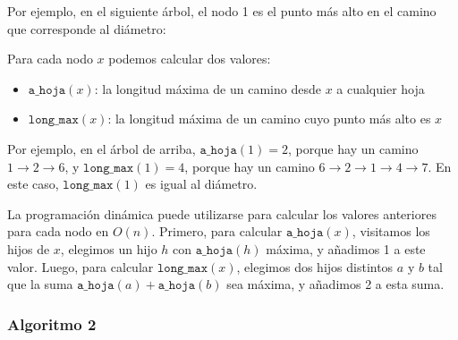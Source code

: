 Por ejemplo, en el siguiente árbol, el nodo 1 es el punto más alto
en el camino que corresponde al diámetro:
\begin{center}
\end{center}

Para cada nodo $x$ podemos calcular dos valores:
\begin{itemize}
    \item $\texttt{a\_hoja}(x)$: la longitud máxima de un camino
          desde $x$ a cualquier hoja
    \item $\texttt{long\_max}(x)$: la longitud máxima de un camino
          cuyo punto más alto es $x$
\end{itemize}

Por ejemplo, en el árbol de arriba, $\texttt{a\_hoja}(1)=2$, porque
hay un camino $1 \rightarrow 2 \rightarrow 6$, y $\texttt{long\_max}(1)=4$,
porque hay un camino
$6 \rightarrow 2 \rightarrow 1 \rightarrow 4 \rightarrow 7$.
En este caso, $\texttt{long\_max}(1)$ es igual al diámetro.

La programación dinámica puede utilizarse para calcular los valores
anteriores para cada nodo en $O(n)$. Primero, para calcular
$\texttt{a\_hoja}(x)$, visitamos los hijos de $x$, elegimos un hijo $h$
con $\texttt{a\_hoja}(h)$ máxima, y añadimos 1 a este valor.
Luego, para calcular $\texttt{long\_max}(x)$, elegimos dos hijos distintos
$a$ y $b$ tal que la suma $\texttt{a\_hoja}(a)+\texttt{a\_hoja}(b)$
sea máxima, y añadimos 2 a esta suma.

\subsubsection{Algoritmo 2}

